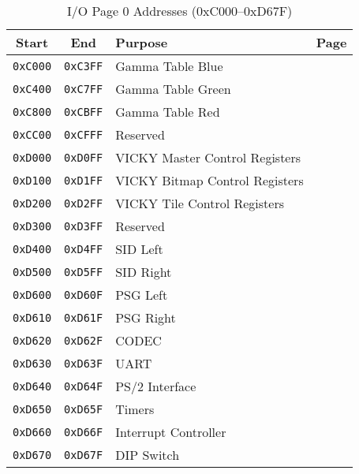 \begin{table}[ht]
    \begin{center}
        \begin{tabular}{|c|c|l|l|} \hline
            Start & End & Purpose & Page \\ \hline \hline
            \verb+0xC000+ & \verb+0xC3FF+ & Gamma Table Blue & \multirow{3}{*}{\pageref{sec:gamma}} \\ \cline{1-3}
            \verb+0xC400+ & \verb+0xC7FF+ & Gamma Table Green & \\ \cline{1-3}
            \verb+0xC800+ & \verb+0xCBFF+ & Gamma Table Red & \\ \hline
            \verb+0xCC00+ & \verb+0xCFFF+ & Reserved & \\ \hline
            \verb+0xD000+ & \verb+0xD0FF+ & VICKY Master Control Registers & \pageref{tab:vky_master_ctrl_reg}\\ \hline
            \verb+0xD100+ & \verb+0xD1FF+ & VICKY Bitmap Control Registers & \pageref{tab:bm_registers} \\ \hline
            \verb+0xD200+ & \verb+0xD2FF+ & VICKY Tile Control Registers & \pageref{tab:tilemap_reg} \\ \hline
            \verb+0xD300+ & \verb+0xD3FF+ & Reserved & \\ \hline
            \verb+0xD400+ & \verb+0xD4FF+ & SID Left & \multirow{2}{*}{\pageref{tab:sid_registers}} \\ \cline{1-3}
            \verb+0xD500+ & \verb+0xD5FF+ & SID Right & \\ \hline
            \verb+0xD600+ & \verb+0xD60F+ & PSG Left & \multirow{2}{*}{\pageref{tab:psg_registers}} \\ \cline{1-3}
            \verb+0xD610+ & \verb+0xD61F+ & PSG Right & \\ \hline
            \verb+0xD620+ & \verb+0xD62F+ & CODEC & \pageref{tab:codec_registers} \\ \hline
            \verb+0xD630+ & \verb+0xD63F+ & UART & \pageref{tab:uart_reg} \\ \hline
            \verb+0xD640+ & \verb+0xD64F+ & PS/2 Interface & \pageref{tab:ps2_reg} \\ \hline
            \verb+0xD650+ & \verb+0xD65F+ & Timers & \pageref{tab:timer_reg} \\ \hline
            \verb+0xD660+ & \verb+0xD66F+ & Interrupt Controller & \pageref{tab:interrupts} \\ \hline
            \verb+0xD670+ & \verb+0xD67F+ & DIP Switch & \pageref{tab:dip_reg} \\ \hline
        \end{tabular}
        \caption{I/O Page 0 Addresses (0xC000--0xD67F)}
        \label{tab:io_page_0}
    \end{center}
\end{table}

